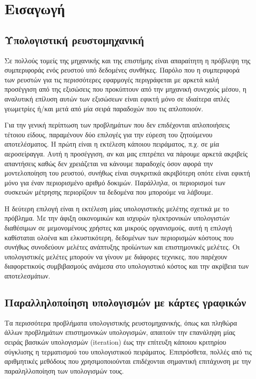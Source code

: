 
\chapter{Εισαγωγή} 

\label{chapter:intro}

\section{Υπολογιστική ρευστομηχανική}

Σε πολλούς τομείς της μηχανικής και της επιστήμης είναι απαραίτητη η πρόβλεψη της συμπεριφοράς ενός ρευστού υπό δεδομένες συνθήκες.
Παρόλο που η συμπεριφορά των ρευστών για τις περισσότερες εφαρμογές περιγράφεται με αρκετά καλή προσέγγιση από της εξισώσεις που προκύπτουν από την μηχανική συνεχούς μέσου, η αναλυτική επίλυση αυτών των εξισώσεων είναι εφικτή μόνο σε ιδιαίτερα απλές γεωμετρίες ή/και μετά από μία σειρά παραδοχών που τις απλοποιούν.

Για την γενική περίπτωση των προβλημάτων που δεν επιδέχονται απλοποιήσεις τέτοιου είδους, παραμένουν δύο επιλογές για την εύρεση του ζητούμενου αποτελέσματος. Η πρώτη είναι η εκτέλεση κάποιου πειράματος, π.χ. σε μία αεροσείραγγα. Αυτή η προσέγγιση, αν και μας επιτρέπει να πάρουμε αρκετά ακριβείς απαντήσεις καθώς δεν χρειάζεται να κάνουμε παραδοχές όσον αφορά την μοντελοποίηση του ρευστού, συνήθως είναι συγκριτικά ακριβότερη οπότε είναι εφικτή μόνο για έναν περιορισμένο αριθμό δοκιμών. Παράλληλα, οι περιορισμοί των συσκευών μέτρησης περιορίζουν τα δεδομένα που μπορούμε να λάβουμε.

Η δεύτερη επιλογή είναι η εκτέλεση μίας υπολογιστικής μελέτης σχετικά με το πρόβλημα. Με την άφιξη οικονομικών και ισχυρών ηλεκτρονικών υπολογιστών διαθέσιμων σε μεμονομένους χρήστες και μικρούς οργανισμούς, αυτή η επιλογή καθίσταται ολοένα και ελκυστικότερη, δεδομένων των περιορισμών κόστους που συνήθως συνοδεύουν μελέτες ανάπτυξης προϊώντων και επιστημονικές μελέτες. Οι υπολογιστικές μελέτες μπορούν να γίνουν με διάφορες τεχνικες, που παρέχουν διαφορετικούς συμβιβασμούς ανάμεσα στο υπολογιστικό κόστος και την ακρίβεια των αποτελεσμάτων.

\section{Παραλληλοποίηση υπολογισμών με κάρτες γραφικών}

Τα περισσότερα προβλήματα υπολογιστικής ρευστομηχανικής, όπως και πληθώρα άλλων προβλημάτων επιστημονικών υπολογισμών, απαιτούν την επανάληψη μίας σειράς βασικών υπολογισμών (iteration) έως την επίτευξη κάποιου κριτηρίου σύγκλισης η τερματισμού του υπολογιστικού πειράματος.
Επιπρόσθετα, πολλές από τις αριθμητικές μεθόδους που χρησιμοποιούνται επιδέχονται σημαντική επιτάχυνση με την παραληλλοποίηση των υπολογισμών τους.

